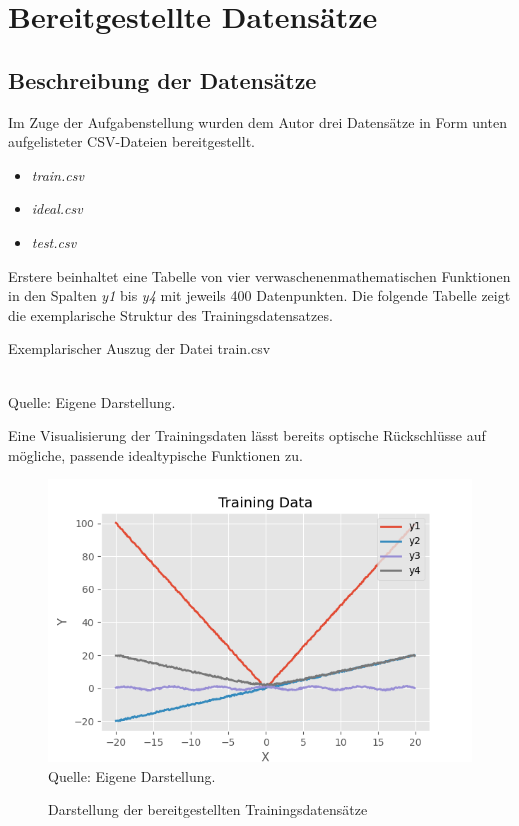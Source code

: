 \section{Bereitgestellte Datensätze}

\subsection{Beschreibung der Datensätze}

Im Zuge der Aufgabenstellung wurden dem Autor drei Datensätze in Form unten aufgelisteter CSV-Dateien bereitgestellt.

\begin{itemize}
 \itemsep0pt
 \item \emph{train.csv}
 \item \emph{ideal.csv}
 \item \emph{test.csv}
\end{itemize}

Erstere beinhaltet eine Tabelle von vier \glqq verwaschenen\grqq mathematischen Funktionen in den Spalten \emph{y1} bis \emph{y4} mit jeweils 400 Datenpunkten. Die folgende Tabelle zeigt die exemplarische Struktur des Trainingsdatensatzes.

\begin{table}[H]
\small
\centering
\caption{Exemplarischer Auszug der Datei train.csv}
\\
Quelle: Eigene Darstellung.
\label{tab:train.csv}
\end{table} 


Eine Visualisierung der Trainingsdaten lässt bereits optische Rückschlüsse auf mögliche, passende idealtypische Funktionen zu.

\begin{figure}[h]
\centering
\caption{Darstellung der bereitgestellten Trainingsdatensätze}
\includegraphics[width=13cm]{../output/figures/train.png}\\
Quelle: Eigene Darstellung.
\label{fig:train}
\end{figure}

